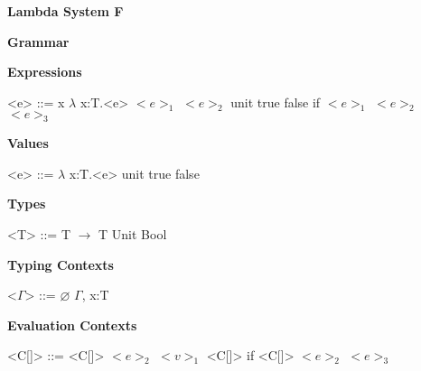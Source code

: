 \documentclass[11pt,oneside]{book}
\begin{document}
\frontmatter

\mainmatter

\pagebreak

\begin{center}
    {
        \bf
        \huge
        Lambda System F
    }
\end{center}

\begin{center}
{
    \bf
    \huge
    Grammar
}
\end{center}


\setlength{\grammarindent}{10em} %

\setlength{\grammarparsep}{5pt} %

\textbf{Expressions}

\begin{grammar}

    <e> ::=  x
        \alt $\lambda$ x:T.<e>
        \alt $<e>_1$ $<e>_2$
        \alt unit
        \alt true
        \alt false
        \alt if $<e>_1$ $<e>_2$ $<e>_3$

\end{grammar}

\textbf{Values}

\begin{grammar}

    <e> ::=  $\lambda$ x:T.<e>
        \alt unit
        \alt true
        \alt false

\end{grammar}

\textbf{Types}

\begin{grammar}

    <T> ::= T $\rightarrow$ T
        \alt Unit
        \alt Bool

\end{grammar}

\textbf{Typing Contexts}

\begin{grammar}

    <$\Gamma$> ::=  $\varnothing$
               \alt $\Gamma$, x:T

\end{grammar}

\textbf{Evaluation Contexts}

\begin{grammar}

    <C[\textbullet]> ::=  \textbullet
                     \alt <C[\textbullet]> $<e>_2$
                     \alt $<v>_1$ <C[\textbullet]>
                     \alt if <C[\textbullet]> $<e>_2$ $<e>_3$
\end{grammar}
\end{document}
